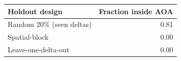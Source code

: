 \begin{tabular}{lr}
\toprule
Holdout design & Fraction inside AOA \\
\midrule
Random 20\% (seen deltas) & 0.81 \\
Spatial-block & 0.00 \\
Leave-one-delta-out & 0.00 \\
\bottomrule
\end{tabular}
